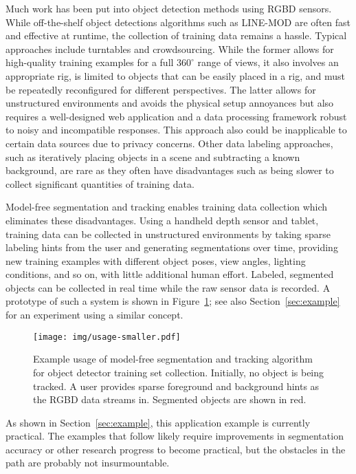 \documentclass[graybox]{svmult}
\newcommand{\todoCR}[1]{\textcolor{blue}{}}
\begin{document}
Much work has been put into object detection methods using RGBD sensors.  While off-the-shelf object detections algorithms such as LINE-MOD \cite{hinterstoisser2011a} are often fast and effective at runtime, the collection of training data remains a hassle.  Typical approaches include turntables and crowdsourcing.  While the former allows for high-quality training examples for a full $360^{\circ}$ range of views, it also involves an appropriate rig, is limited to objects that can be easily placed in a rig, and must be repeatedly reconfigured for different perspectives.  The latter allows for unstructured environments and avoids the physical setup annoyances but also requires a well-designed web application and a data processing framework robust to noisy and incompatible responses. This approach also could be inapplicable to certain data sources due to privacy concerns.  Other data labeling approaches, such as iteratively placing objects in a scene and subtracting a known background, are rare as they often have disadvantages such as being slower to collect significant quantities of training data.

Model-free segmentation and tracking enables training data collection which eliminates these disadvantages.  Using a handheld depth sensor and tablet, training data can be collected in unstructured environments by taking sparse labeling hints from the user and generating segmentations over time, providing new training examples with different object poses, view angles, lighting conditions, and so on, with little additional human effort.  Labeled, segmented objects can be collected in real time while the raw sensor data is recorded.  A prototype of such a system is shown in Figure~\ref{fig:usage}; see also Section~\ref{sec:example} for an experiment using a similar concept.

\begin{figure}
  \centering
  \texttt{[image: img/usage-smaller.pdf]}
  \caption{Example usage of model-free segmentation and tracking algorithm for object detector training set collection.  Initially, no object is being tracked.  A user provides sparse foreground and background hints as the RGBD data streams in.  Segmented objects are shown in red. \todoCR{Show pose changes, fix focus}}
  \label{fig:usage}
\end{figure}

As shown in Section~\ref{sec:example}, this application example is currently practical.  The examples that follow likely require improvements in segmentation accuracy or other research progress to become practical, but the obstacles in the path are probably not insurmountable.
\end{document}
